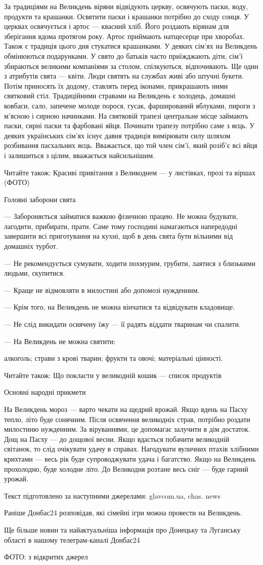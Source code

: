 За традиціями на Великдень віряни відвідують церкву, освячують паски, воду,
продукти та крашанки. Освятити паски і крашанки потрібно до сходу сонця. У
церквах освячується і артос — квасний хліб. Його роздають вірянам для
зберігання вдома протягом року. Артос приймають натщесерце при хворобах. Також
є традиція цього дня стукатися крашанками. У деяких сім'ях на Великдень
обмінюються подарунками. У свято до батьків часто приїжджають діти, сім'ї
збираються великими компаніями за столом, спілкуються, відпочивають. Ще один з
атрибутів свята — квіти. Люди святять на службах живі або штучні букети. Потім
приносять їх додому, ставлять перед іконами, прикрашають ними святковий стіл.
Традиційними стравами на Великдень є холодець, домашні ковбаси, сало, запечене
молоде порося, гусак, фарширований яблуками, пироги з м’ясною і сирною
начинками. На святковій трапезі центральне місце займають паски, сирні паски та
фарбовані яйця. Починати трапезу потрібно саме з яєць. У деяких українських
сім'ях існує давня традиція вимірювати силу шляхом розбивання пасхальних яєць.
Вважається, що той член сім'ї, який розіб'є всі яйця і залишиться з цілим,
вважається найсильнішим.

Читайте також: Красиві привітання з Великоднем — у листівках, прозі та віршах
(ФОТО)

Головні заборони свята

— Забороняється займатися важкою фізичною працею. Не можна будувати, лагодити,
прибирати, прати. Саме тому господині намагаються напередодні завершити всі
приготування на кухні, щоб в день свята бути вільними від домашніх турбот.

— Не рекомендується сумувати, ходити похмурим, грубити, лаятися з близькими людьми, скупитися.

— Краще не відмовляти в милостині або допомозі нужденним.

— Крім того, на Великдень не можна вінчатися та відвідувати кладовище.

— Не слід викидати освячену їжу — її радять віддати тваринам чи спалити.

— На Великдень не можна святити:

алкоголь;
страви з крові тварин;
фрукти та овочі;
матеріальні цінності.

Читайте також: Що покласти у великодній кошик — список продуктів

Основні народні прикмети

На Великдень мороз — варто чекати на щедрий врожай.
Якщо вдень на Пасху тепло, літо буде сонячним.
Після освячення великодніх страв, потрібно роздати милостиню нужденним. За віруваннями, це допомагає залучити в дім достаток.
Дощ на Пасху — до дощової весни.
Якщо вдасться побачити великодній світанок, то слід очікувати удачу в справах.
Нагодувати вуличних птахів хлібними крихтами — весь рік буде супроводжувати удача і багатство.
Якщо на Великдень прохолодно, буде холодне літо.
До Великодня розтане весь сніг — буде гарний урожай.

Текст підготовлено за наступними джерелами: glavcom.ua, chas. news

Раніше Донбас24 розповідав, які сімейні ігри можна провести на Великдень.

Ще більше новин та найактуальніша інформація про Донецьку та Луганську області в нашому телеграм-каналі Донбас24

ФОТО: з відкритих джерел
